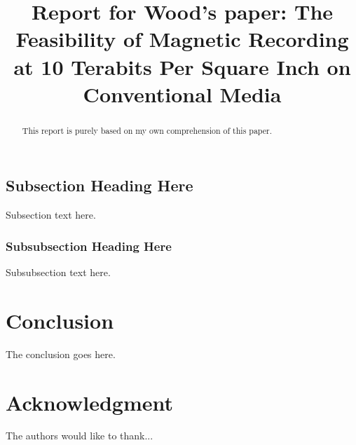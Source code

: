 \documentclass[conference]{IEEEtran}
\begin{document}
\title{Report for Wood's paper: 
The Feasibility of Magnetic Recording at 10 Terabits Per Square Inch on Conventional Media}

\author{
}

\maketitle

\begin{abstract}
This report is purely based on my own comprehension of this paper.
\end{abstract}

\IEEEpeerreviewmaketitle





\subsection{Subsection Heading Here}
Subsection text here.


\subsubsection{Subsubsection Heading Here}
Subsubsection text here.



\section{Conclusion}
The conclusion goes here.


\section*{Acknowledgment}


The authors would like to thank...



\end{document}
